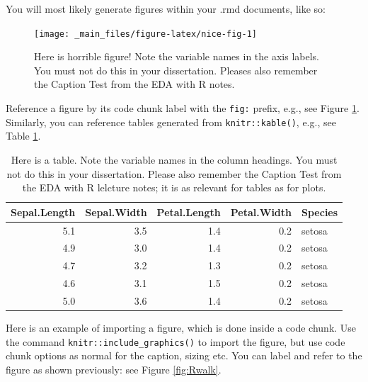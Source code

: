 \documentclass[
  12pt,
  a4paper,
  twoside]{book}
\begin{document}
You will most likely generate figures within your .rmd documents, like so:

\begin{figure}[H]

{\centering \texttt{[image: \_main\_files/figure-latex/nice-fig-1]} 

}

\caption{Here is horrible figure! Note the variable names in the axis labels. You must not do this in your dissertation. Pleases also remember the Caption Test from the EDA with R notes.}\label{fig:nice-fig}
\end{figure}

Reference a figure by its code chunk label with the \texttt{fig:} prefix, e.g., see Figure \ref{fig:nice-fig}. Similarly, you can reference tables generated from \texttt{knitr::kable()}, e.g., see Table \ref{tab:nice-tab}.

\begin{table}

\caption{\label{tab:nice-tab}Here is a table. Note the variable names in the column headings. You must not do this in your dissertation. Please also remember the Caption Test from the EDA with R lelcture notes; it is as relevant for tables as for plots.}
\centering
\begin{tabular}[t]{rrrrl}
\toprule
Sepal.Length & Sepal.Width & Petal.Length & Petal.Width & Species\\
\midrule
5.1 & 3.5 & 1.4 & 0.2 & setosa\\
4.9 & 3.0 & 1.4 & 0.2 & setosa\\
4.7 & 3.2 & 1.3 & 0.2 & setosa\\
4.6 & 3.1 & 1.5 & 0.2 & setosa\\
5.0 & 3.6 & 1.4 & 0.2 & setosa\\
\bottomrule
\end{tabular}
\end{table}

Here is an example of importing a figure, which is done inside a code chunk. Use the command \texttt{knitr::include\_graphics()} to import the figure, but use code chunk options as normal for the caption, sizing etc. You can label and refer to the figure as shown previously: see Figure \ref{fig:Rwalk}.
\end{document}
